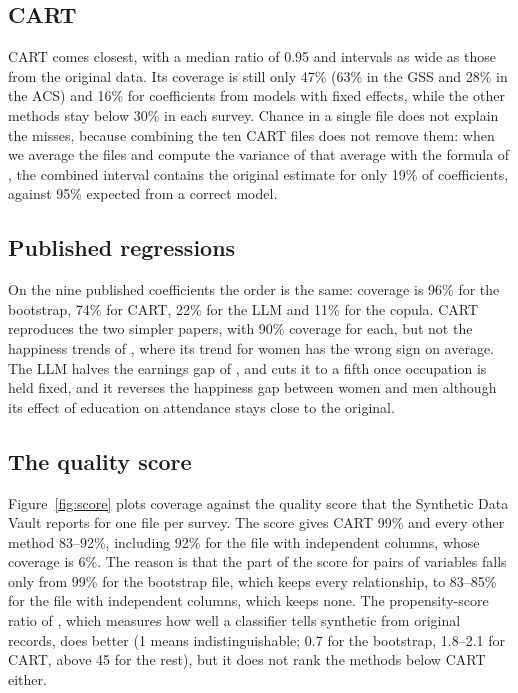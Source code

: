 \documentclass[10pt]{article}
\begin{document}
\subsection{CART}
CART comes closest, with a median ratio of 0.95 and intervals as wide as those from the original data.
Its coverage is still only 47\% (63\% in the GSS and 28\% in the ACS) and 16\% for coefficients
from models with fixed effects, while the other methods stay below 30\% in each survey. Chance in a single file does not explain the misses,
because combining the ten CART files does not remove them: when we average the files and compute the
variance of that average with the formula of \citet{raab2016}, the combined interval contains the
original estimate for only 19\% of coefficients, against 95\% expected from a correct model.

\subsection{Published regressions}
On the nine published coefficients the order is the same: coverage is 96\% for the bootstrap, 74\% for CART,
22\% for the LLM and 11\% for the copula. CART reproduces the two simpler papers, with 90\% coverage
for each, but not the happiness trends of \citet{stevenson2009}, where its trend for women has the wrong
sign on average. The LLM halves the earnings gap of \citet{goldin2014}, and cuts it to a fifth once
occupation is held fixed, and it reverses the happiness gap between women and men although its
effect of education on attendance stays close to the original.

\subsection{The quality score}
Figure~\ref{fig:score} plots coverage against the quality score that the Synthetic Data Vault reports for one file per survey. The
score gives CART 99\% and every other method 83--92\%, including 92\% for the file with independent
columns, whose coverage is 6\%. The reason is that the part of the score for pairs of variables falls only from 99\% for the bootstrap
file, which keeps every relationship, to 83--85\% for the file with independent columns, which keeps none. The propensity-score ratio of \citet{snoke2018}, which measures how well
a classifier tells synthetic from original records, does better (1 means indistinguishable; 0.7 for the bootstrap, 1.8--2.1 for CART,
above 45 for the rest), but it does not rank the methods below CART either.
\end{document}
